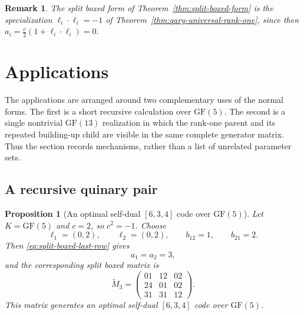\documentclass[12pt]{article}
\newtheorem{prop}[theorem]{Proposition}
\newtheorem{remark}[theorem]{Remark}
\newcommand{\GF}[1]{\ensuremath{\mathrm{GF}(#1)}}
\begin{document}
\begin{remark}
\rm
The split boxed form of Theorem~\ref{thm:split-boxed-form} is the
specialization \(\ell_i\cdot\ell_i=-1\) of
Theorem~\ref{thm:qary-universal-rank-one}, since then
\(a_i=\frac c2(1+\ell_i\cdot\ell_i)=0\).
\end{remark}

  {}
  {}

\section{Applications}\label{sec:applications}

The applications are arranged around two complementary uses of the normal
forms.  The first is a short recursive calculation over \(\GF{5}\).  The
second is a single nontrivial
\(\GF{13}\) realization in which the rank-one parent and its repeated
building-up child are visible in the same complete generator matrix.  Thus
the section records mechanisms, rather than a list of unrelated parameter
sets.

\subsection{A recursive quinary pair}

\begin{prop}[An optimal self-dual \texorpdfstring{$[6,3,4]$}{[6,3,4]} code over \texorpdfstring{$\GF{5}$}{GF(5)}]
\label{ex:split-boxed-63}
\rm
Let \(K=\GF{5}\) and \(c=2\), so \(c^2=-1\). Choose
\[
\ell_1=(0,2),\qquad \ell_2=(0,2),\qquad b_{12}=1,\qquad b_{21}=2.
\]
Then \eqref{eq:split-boxed-last-row} gives
\[
a_1=a_2=3,
\]
and the corresponding split boxed matrix is
\[
\widetilde M_3=
\begin{pmatrix}
01 & 12 & 02\\
24 & 01 & 02\\
31 & 31 & 12
\end{pmatrix}.
\]
This matrix generates an optimal self-dual \([6,3,4]\) code over \(\GF{5}\).
\end{prop}
\end{document}
